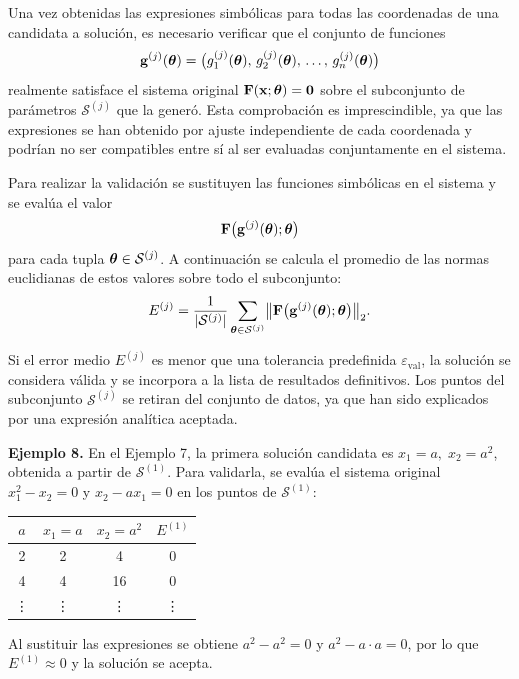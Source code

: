 Una vez obtenidas las expresiones simbólicas para todas las coordenadas de una candidata a solución, es necesario verificar que el conjunto de funciones \[ \mathbf{g}^{(j)}(\boldsymbol{\theta}) = \bigl( g_1^{(j)}(\boldsymbol{\theta}),\, g_2^{(j)}(\boldsymbol{\theta}),\, \dots,\, g_n^{(j)}(\boldsymbol{\theta}) \bigr) \] realmente satisface el sistema original \(\mathbf{F}(\mathbf{x}; \boldsymbol{\theta}) = \mathbf{0}\) sobre el subconjunto de parámetros \(\mathcal{S}^{(j)}\) que la generó. Esta comprobación es imprescindible, ya que las expresiones se han obtenido por ajuste independiente de cada coordenada y podrían no ser compatibles entre sí al ser evaluadas conjuntamente en el sistema.

Para realizar la validación se sustituyen las funciones simbólicas en el sistema y se evalúa el valor \[ \mathbf{F}\bigl( \mathbf{g}^{(j)}(\boldsymbol{\theta}); \boldsymbol{\theta} \bigr) \] para cada tupla \(\boldsymbol{\theta} \in \mathcal{S}^{(j)}\). A continuación se calcula el promedio de las normas euclidianas de estos valores sobre todo el subconjunto: \[ E^{(j)} = \frac{1}{|\mathcal{S}^{(j)}|} \sum_{\boldsymbol{\theta} \in \mathcal{S}^{(j)}} \bigl\| \mathbf{F}\bigl( \mathbf{g}^{(j)}(\boldsymbol{\theta}); \boldsymbol{\theta} \bigr) \bigr\|_2. \]

Si el error medio \(E^{(j)}\) es menor que una tolerancia predefinida \(\varepsilon_{\text{val}}\), la solución se considera válida y se incorpora a la lista de resultados definitivos. Los puntos del subconjunto \(\mathcal{S}^{(j)}\) se retiran del conjunto de datos, ya que han sido explicados por una expresión analítica aceptada.

\bigskip \noindent\textbf{Ejemplo 8.} En el Ejemplo 7, la primera solución candidata es \(x_1 = a,\; x_2 = a^2\), obtenida a partir de \(\mathcal{S}^{(1)}\). Para validarla, se evalúa el sistema original \(x_1^2 - x_2 = 0\) y \(x_2 - a x_1 = 0\) en los puntos de \(\mathcal{S}^{(1)}\):

\begin{center} \begin{tabular}{c|c|c|c}
\(a\) & \(x_1 = a\) & \(x_2 = a^2\) & \(E^{(1)}\) \\
\hline
2 & 2 & 4 & 0 \\
4 & 4 & 16 & 0 \\
\vdots & \vdots & \vdots & \vdots \end{tabular} \end{center}

Al sustituir las expresiones se obtiene \(a^2 - a^2 = 0\) y \(a^2 - a \cdot a = 0\), por lo que \(E^{(1)} \approx 0\) y la solución se acepta.

